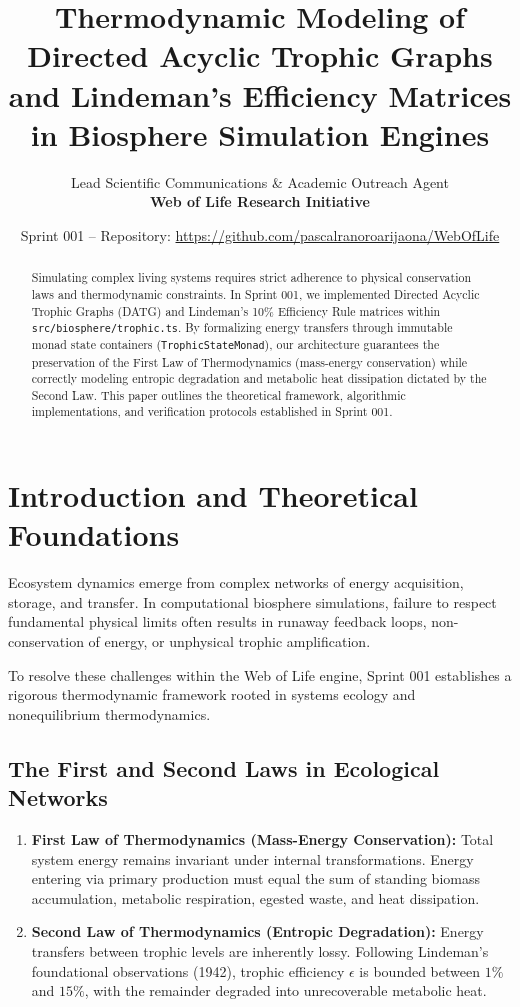 \documentclass[11pt, a4paper]{article}
\title{\textbf{Thermodynamic Modeling of Directed Acyclic Trophic Graphs and Lindeman's Efficiency Matrices in Biosphere Simulation Engines}}
\author{Lead Scientific Communications \& Academic Outreach Agent \\ \textbf{Web of Life Research Initiative}}
\date{Sprint 001 -- Repository: \url{https://github.com/pascalranoroarijaona/WebOfLife}}
\begin{document}
\maketitle

\begin{abstract}
Simulating complex living systems requires strict adherence to physical conservation laws and thermodynamic constraints. In Sprint 001, we implemented Directed Acyclic Trophic Graphs (DATG) and Lindeman's 10\% Efficiency Rule matrices within \texttt{src/biosphere/trophic.ts}. By formalizing energy transfers through immutable monad state containers (\texttt{TrophicStateMonad}), our architecture guarantees the preservation of the First Law of Thermodynamics (mass-energy conservation) while correctly modeling entropic degradation and metabolic heat dissipation dictated by the Second Law. This paper outlines the theoretical framework, algorithmic implementations, and verification protocols established in Sprint 001.
\end{abstract}

\section{Introduction and Theoretical Foundations}
Ecosystem dynamics emerge from complex networks of energy acquisition, storage, and transfer. In computational biosphere simulations, failure to respect fundamental physical limits often results in runaway feedback loops, non-conservation of energy, or unphysical trophic amplification. 

To resolve these challenges within the Web of Life engine, Sprint 001 establishes a rigorous thermodynamic framework rooted in systems ecology and nonequilibrium thermodynamics.

\subsection{The First and Second Laws in Ecological Networks}
\begin{enumerate}
    \item \textbf{First Law of Thermodynamics (Mass-Energy Conservation):} Total system energy remains invariant under internal transformations. Energy entering via primary production must equal the sum of standing biomass accumulation, metabolic respiration, egested waste, and heat dissipation.
    \item \textbf{Second Law of Thermodynamics (Entropic Degradation):} Energy transfers between trophic levels are inherently lossy. Following Lindeman's foundational observations (1942), trophic efficiency $\epsilon$ is bounded between $1\%$ and $15\%$, with the remainder degraded into unrecoverable metabolic heat.
\end{enumerate}
\end{document}

